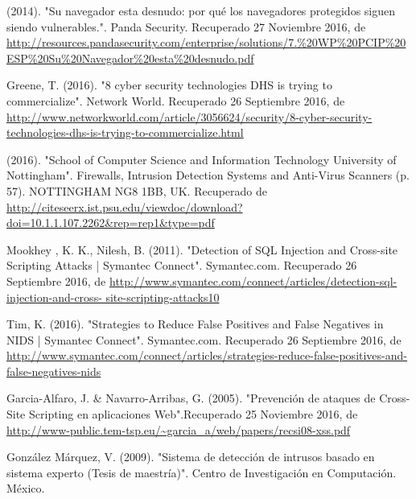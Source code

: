 \begin{thebibliography}{99}
 (2014). "Su navegador esta desnudo: por qué los navegadores protegidos siguen siendo vulnerables.". Panda Security. Recuperado 27 Noviembre 2016, de \url{http://resources.pandasecurity.com/enterprise/solutions/7.\%20WP\%20PCIP\%20ESP\%20Su\%20Navegador\%20esta\%20desnudo.pdf}

 Greene, T. (2016). "8 cyber security technologies DHS is trying to commercialize". Network World. Recuperado 26 Septiembre 2016, de \url{http://www.networkworld.com/article/3056624/security/8-cyber-security-technologies-dhs-is-trying-to-commercialize.html}

 (2016). "School of Computer Science and Information Technology University of Nottingham". Firewalls, Intrusion Detection Systems and Anti-Virus Scanners (p. 57). NOTTINGHAM NG8 1BB, UK. Recuperado de \url{http://citeseerx.ist.psu.edu/viewdoc/download?doi=10.1.1.107.2262\&rep=rep1\&type=pdf}

 Mookhey , K. K., Nilesh, B. (2011). "Detection of SQL Injection and Cross-site Scripting Attacks | Symantec Connect".
Symantec.com. Recuperado 26 Septiembre 2016, de \url{http://www.symantec.com/connect/articles/detection-sql-injection-and-cross- site-scripting-attacks10}

 Tim, K. (2016). "Strategies to Reduce False Positives and False Negatives in NIDS | Symantec Connect". Symantec.com.
Recuperado 26 Septiembre 2016, de \url{http://www.symantec.com/connect/articles/strategies-reduce-false-positives-and-false-negatives-nids}

 Garcia-Alfaro, J. \& Navarro-Arribas, G. (2005). "Prevención de ataques de Cross-Site Scripting en aplicaciones Web".Recuperado 25 Noviembre 2016, de \url{http://www-public.tem-tsp.eu/~garcia\_a/web/papers/recsi08-xss.pdf}

 González Márquez, V. (2009). "Sistema de detección de intrusos basado en sistema experto (Tesis de maestría)". Centro de Investigación en Computación. México.



\end{thebibliography}

